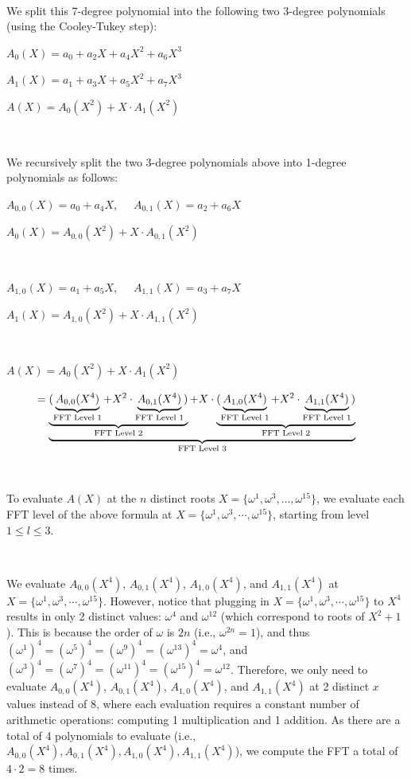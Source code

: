 $ $

We split this 7-degree polynomial into the following two 3-degree polynomials (using the Cooley-Tukey step): 

$A_0(X) = a_0 + a_2X + a_4X^2 + a_6X^3$

$A_1(X) = a_1 + a_3X + a_5X^2 + a_7X^3$

$A(X) = A_0(X^2) + X \cdot A_1(X^2)$

$ $

We recursively split the two 3-degree polynomials above into 1-degree polynomials as follows:


$A_{0,0}(X) = a_0 + a_4X$, \textcolor{white}{...} $A_{0,1}(X) = a_2 + a_6X$

$A_0(X) = A_{0,0}(X^2) + X\cdot A_{0,1}(X^2)$

$ $

$A_{1,0}(X) = a_1 + a_5X$, \textcolor{white}{...} $A_{1,1}(X) = a_3 + a_7X$

$A_1(X) = A_{1,0}(X^2) + X\cdot A_{1,1}(X^2)$

$ $

$A(X) = A_0(X^2) + X \cdot A_1(X^2)$

$\mathcolor{white}{A(X)} = \underbrace{\underbrace{(\underbrace{A_{0,0}(X^4)}_{\text{FFT Level 1}} + X^2\cdot \underbrace{A_{0,1}(X^4)}_{\text{FFT Level 1}})}_{\text{FFT Level 2}} + X \cdot \underbrace{(\underbrace{A_{1,0}(X^4)}_{\text{FFT Level 1}} + X^2\cdot \underbrace{A_{1,1}(X^4)}_{\text{FFT Level 1}})}_{\text{FFT Level 2}}}_{\text{FFT Level 3}}$

$ $

To evaluate $A(X)$ at the $n$ distinct roots $X = \{\omega^1, \omega^3, \ldots, \omega^{15}\}$, we evaluate each FFT level of the above formula at $X = \{\omega^1, \omega^3, \cdots, \omega^{15}\}$, starting from level $1 \leq l \leq 3$. 

$ $

 We evaluate $A_{0,0}(X^4)$, $A_{0,1}(X^4)$, $A_{1,0}(X^4)$, and $A_{1,1}(X^4)$ at $X = \{\omega^1, \omega^3, \cdots, \omega^{15}\}$. However, notice that plugging in $X = \{\omega^1, \omega^3, \cdots, \omega^{15}\}$ to $X^4$ results in only 2 distinct values: $\omega^4$ and $\omega^{12}$ (which correspond to roots of $X^2+1$). This is because the order of $\omega$ is $2n$ (i.e., $\omega^{2n} = 1$), and thus $(\omega^1)^4 = (\omega^5)^4 = (\omega^9)^4 = (\omega^{13})^4 = \omega^4$, and $(\omega^3)^4 = (\omega^7)^4 = (\omega^{11})^4 = (\omega^{15})^4 = \omega^{12}$.
Therefore, we only need to evaluate $A_{0,0}(X^4)$, $A_{0,1}(X^4)$, $A_{1,0}(X^4)$, and $A_{1,1}(X^4)$ at 2 distinct $x$ values instead of 8, where each evaluation requires a constant number of arithmetic operations: computing 1 multiplication and 1 addition. As there are a total of 4 polynomials to evaluate (i.e., $A_{0, 0}(X^4), A_{0, 1}(X^4), A_{1, 0}(X^4), A_{1, 1}(X^4)$), we compute the FFT a total of $4 \cdot 2 = 8$ times. 

